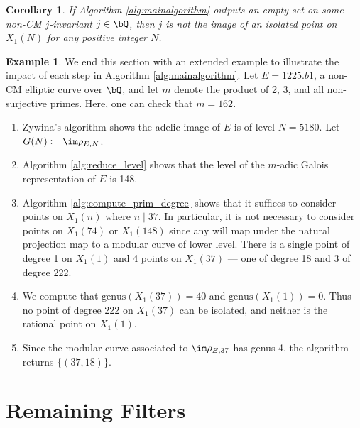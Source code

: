 \documentclass[11pt,reqno]{amsart}
\theoremstyle{plain}
\newtheorem{corollary}[theorem]{Corollary}
\theoremstyle{definition}
\newtheorem{example}[theorem]{Example}
\newcommand{\Q}{\bQ}
\begin{document}
\begin{corollary}\label{cor:P1_isolated}
If Algorithm \ref{alg:mainalgorithm} outputs an empty set on some non-CM $j$-invariant $j \in \Q$, then $j$ is not the image of an  isolated point on $X_1(N)$ for any positive integer $N$.
\end{corollary}

\begin{example}
We end this section with an extended example to illustrate the impact of each step in Algorithm \ref{alg:mainalgorithm}. Let $E=1225.b1$, a non-CM elliptic curve over $\Q$, and let $m$ denote the product of 2, 3, and all non-surjective primes. Here, one can check that $m=162$.
\begin{enumerate}
\item Zywina's algorithm shows the adelic image of $E$ is of level $N=5180$. Let $G(N) \coloneqq \im \rho_{E,N}$.
\item Algorithm \ref{alg:reduce_level} shows that the level of the $m$-adic Galois representation of $E$ is 148.
\item Algorithm \ref{alg:compute_prim_degree} shows that it suffices to consider points on $X_1(n)$ where $n \mid 37$. In particular, it is not necessary to consider points on $X_1(74)$ or $X_1(148)$ since any will map under the natural projection map to a modular curve of lower level. There is a single point of degree 1 on $X_1(1)$ and 4 points on $X_1(37)$ --- one of degree 18 and 3 of degree 222.
\item We compute that $\text{genus}(X_1(37))=40$ and  $\text{genus}(X_1(1))=0$. Thus no point of degree 222 on $X_1(37)$ can be isolated, and neither is the rational point on $X_1(1)$.
\item Since the modular curve associated to $\im \rho_{E,37}$ has genus 4, the algorithm returns $ \{( 37, 18)\}$.
\end{enumerate}
\end{example}

\section{Remaining Filters}
\label{sec:remainingfilters}
\end{document}
